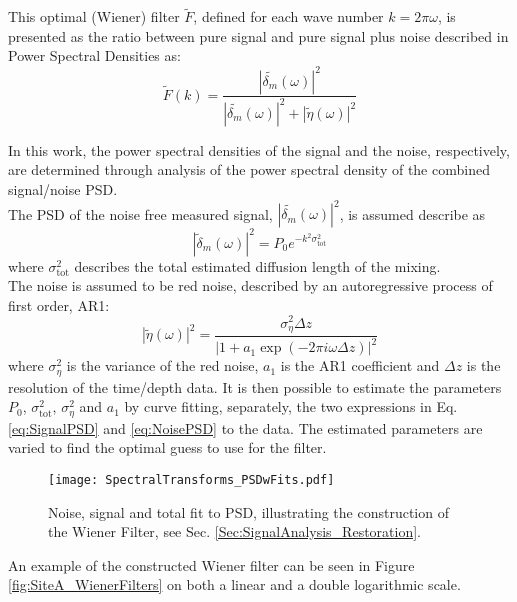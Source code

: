\documentclass[../../CompleteThesis2/Complete_2ndDraft]{subfiles}
\begin{document}
This optimal (Wiener) filter $\tilde{F}$, defined for each wave number $k = 2\pi \omega$, is presented as the ratio between pure signal and pure signal plus noise described in Power Spectral Densities as:
\begin{equation}
	\tilde{F}(k) =\frac{|\tilde{\delta_m}(\omega)|^2}{|\tilde{\delta_m}(\omega)|^2 + |\tilde{\eta}(\omega)|^2}
	\label{eq:WienerFilter}
\end{equation}

In this work, the power spectral densities of the signal and the noise, respectively, are determined through analysis of the power spectral density of the combined signal/noise PSD.\\
The PSD of the noise free measured signal, $|\tilde{\delta_m}(\omega)|^2$, is assumed describe as 
\begin{equation}
	|\tilde{\delta}_m(\omega)|^2 = P_0 e^{-k^2 \sigma_{\text{tot}}^2}
	\label{eq:SignalPSD}
\end{equation}
where $\sigma_{\text{tot}}^2$ describes the total estimated diffusion length of the mixing.\\
The noise is assumed to be red noise, described by an autoregressive process of first order, AR1:
\begin{equation}
	|\tilde{\eta}(\omega)|^2 = \frac{\sigma_{\eta}^2 \Delta z}{|1 + a_1 \exp(-2\pi i \omega \Delta z)|^2}
	\label{eq:NoisePSD}
\end{equation}
where $\sigma_{\eta}^2$ is the variance of the red noise, $a_1$ is the AR1 coefficient and $\Delta z$ is the resolution of the time/depth data.
It is then possible to estimate the parameters $P_0$, $\sigma_{\text{tot}}^2$, $\sigma_{\eta}^2$ and $a_1$ by curve fitting, separately, the two expressions in Eq. \ref{eq:SignalPSD} and \ref{eq:NoisePSD} to the data. The estimated parameters are varied to find the optimal guess to use for the filter.

\begin{figure}
	\centering
	\texttt{[image: SpectralTransforms\_PSDwFits.pdf]}
	\caption[FFT, DCT, NDCT PSDs with Fit, Site A]{\small Noise, signal and total fit to PSD, illustrating the construction of the Wiener Filter, see Sec. \ref{Sec:SignalAnalysis_Restoration}.}
	\label{fig:SpectralTransforms_PSDwFits}
\end{figure}

An example of the constructed Wiener filter can be seen in Figure \ref{fig:SiteA_WienerFilters} on both a linear and a double logarithmic scale.
\end{document}
